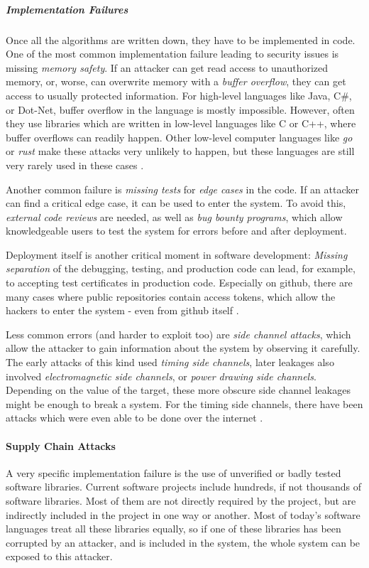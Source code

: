 \subparagraph{Implementation Failures}

Once all the algorithms are written down, they have to be implemented in code.
One of the most common implementation failure leading to security issues is missing
\emph{memory safety}.
If an attacker can get read access to unauthorized memory, or, worse, can overwrite
memory with a \emph{buffer overflow}, they can get access to usually protected
information.
For high-level languages like Java, C\#, or Dot-Net, buffer overflow in the language
is mostly impossible.
However, often they use libraries which are written in low-level languages like
C or C++, where buffer overflows can readily happen.
Other low-level computer languages like \emph{go} or \emph{rust} make these attacks very unlikely
to happen, but these languages are still very rarely used in these cases \cite{HeartbleedXKCD}.

Another common failure is \emph{missing tests} for \emph{edge cases} in the code.
If an attacker can find a critical edge case, it can be used to enter the system.
To avoid this, \emph{external code reviews} are needed, as well as \emph{bug bounty programs},
which allow knowledgeable users to test the system for errors before and after
deployment.

Deployment itself is another critical moment in software development:
\emph{Missing separation} of the debugging, testing, and production code can lead, for
example, to accepting test certificates in production code.
Especially on github, there are many cases where public repositories contain
access tokens, which allow the hackers to enter the system - even from
github itself \cite{GithubPrivate23}.

Less common errors (and harder to exploit too) are \emph{side channel attacks}, which allow the attacker to gain
information about the system by observing it carefully.
The early attacks of this kind used \emph{timing side channels}, later leakages also
involved \emph{electromagnetic side channels}, or \emph{power drawing side channels}.
Depending on the value of the target, these more obscure side channel leakages might 
be enough to break a system.
For the timing side channels, there have been attacks which were even able to be done
over the internet \cite{BB03}.

\paragraph{Supply Chain Attacks}

A very specific implementation failure is the use of unverified or badly tested
software libraries.
Current software projects include hundreds, if not thousands of software libraries.
Most of them are not directly required by the project, but are indirectly included
in the project in one way or another.
Most of today's software languages treat all these libraries equally, so if one of
these libraries has been corrupted by an attacker, and is included in the system,
the whole system can be exposed to this attacker.

